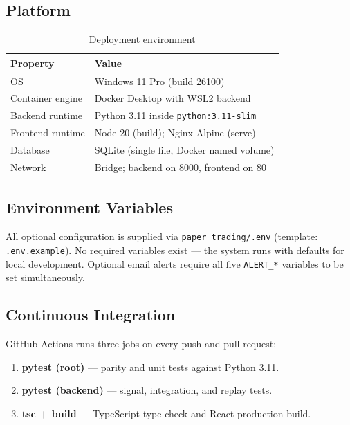 \documentclass[12pt, a4paper]{article}
\theoremstyle{definition}
\begin{document}
\subsection{Platform}

\begin{table}[H]
\centering
\caption{Deployment environment}
\begin{tabular}{ll}
\toprule
\textbf{Property} & \textbf{Value} \\
\midrule
OS              & Windows 11 Pro (build 26100) \\
Container engine & Docker Desktop with WSL2 backend \\
Backend runtime  & Python 3.11 inside \texttt{python:3.11-slim} \\
Frontend runtime & Node 20 (build); Nginx Alpine (serve) \\
Database         & SQLite (single file, Docker named volume) \\
Network          & Bridge; backend on 8000, frontend on 80 \\
\bottomrule
\end{tabular}
\end{table}

\subsection{Environment Variables}

All optional configuration is supplied via \texttt{paper\_trading/.env}
(template: \texttt{.env.example}). No required variables exist — the system
runs with defaults for local development. Optional email alerts require all
five \texttt{ALERT\_*} variables to be set simultaneously.

\subsection{Continuous Integration}

GitHub Actions runs three jobs on every push and pull request:

\begin{enumerate}[leftmargin=2em]
    \item \textbf{pytest (root)} — parity and unit tests against Python 3.11.
    \item \textbf{pytest (backend)} — signal, integration, and replay tests.
    \item \textbf{tsc + build} — TypeScript type check and React production build.
\end{enumerate}
\end{document}
